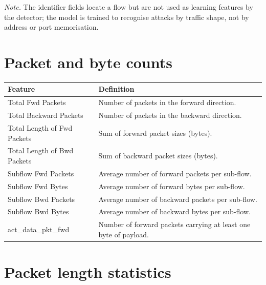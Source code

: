 \vspace{1em}
\noindent\textit{Note.} The identifier fields locate a flow but are not used as learning features by the detector; the model is trained to recognise attacks by traffic shape, not by address or port memorisation.

\section{Packet and byte counts}
\label{app:feat_counts}

\begin{tabularx}{\textwidth}{lX}
  \toprule
  \textbf{Feature} & \textbf{Definition} \\
  \midrule
  Total Fwd Packets            & Number of packets in the forward direction. \\
  Total Backward Packets       & Number of packets in the backward direction. \\
  Total Length of Fwd Packets  & Sum of forward packet sizes (bytes). \\
  Total Length of Bwd Packets  & Sum of backward packet sizes (bytes). \\
  Subflow Fwd Packets          & Average number of forward packets per sub-flow. \\
  Subflow Fwd Bytes            & Average number of forward bytes per sub-flow. \\
  Subflow Bwd Packets          & Average number of backward packets per sub-flow. \\
  Subflow Bwd Bytes            & Average number of backward bytes per sub-flow. \\
  act\_data\_pkt\_fwd          & Number of forward packets carrying at least one byte of payload. \\
  \bottomrule
\end{tabularx}

\section{Packet length statistics}
\label{app:feat_lengths}

